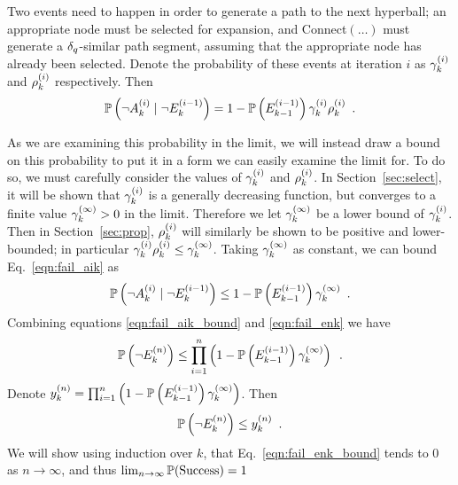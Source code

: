 Two events need to happen in order to generate a path to the next hyperball; an appropriate node must be selected for expansion, and Connect$(\dots)$ must generate a $\delta_q$-similar path segment, assuming that the appropriate node has already been selected. Denote the probability of these events at iteration $i$ as $\gamma_k^{(i)}$ and $\rho_k^{(i)}$ respectively. Then
\begin{equation}
    \mathbb{P}\left( \neg A^{(i)}_k \mid \neg E^{(i-1)}_k \right) = 1 - \mathbb{P}\left( E^{(i-1)}_{k-1} \right) \gamma_k^{(i)} \rho_k^{(i)} \enspace .
    \label{eqn:fail_aik}
\end{equation}

\noindent
As we are examining this probability in the limit, we will instead draw a bound on this probability to put it in a form we can easily examine the limit for. To do so, we must carefully consider the values of $\gamma_k^{(i)}$ and $\rho_k^{(i)}$.  In Section~\ref{sec:select}, it will be shown that $\gamma_k^{(i)}$ is a generally decreasing function, but converges to a finite value $\gamma_k^{(\infty)} > 0$ in the limit.  Therefore we let $\gamma_k^{(\infty)}$ be a lower bound of $\gamma_k^{(i)}$.  Then in Section~\ref{sec:prop}, $\rho_k^{(i)}$ will similarly be shown to be positive and lower-bounded; in particular $\gamma_k^{(i)} \rho_k^{(i)} \leq \gamma_k^{(\infty)}$.  Taking $\gamma_k^{(\infty)}$ as constant, we can bound Eq.~\eqref{eqn:fail_aik} as
\begin{equation}
    \mathbb{P}\left( \neg A^{(i)}_k \mid \neg E^{(i-1)}_k \right) \leq 1 - \mathbb{P}\left( E^{(i-1)}_{k-1} \right) \gamma_k^{(\infty)} \enspace .
    \label{eqn:fail_aik_bound}
\end{equation}
Combining equations \eqref{eqn:fail_aik_bound} and \eqref{eqn:fail_enk} we have
\begin{equation}
    \mathbb{P}\left( \neg E^{(n)}_k \right) \leq \prod_{i=1}^n \left(1 - \mathbb{P}\left( E^{(i-1)}_{k-1} \right) \gamma_k^{(\infty)} \right) \enspace .
\end{equation}
Denote $y^{(n)}_k = \prod_{i=1}^n \left(1 - \mathbb{P}\left( E^{(i-1)}_{k-1} \right) \gamma_k^{(\infty)} \right)$. Then
\begin{equation}
    \mathbb{P}\left( \neg E^{(n)}_k \right) \leq y^{(n)}_k \enspace .
    \label{eqn:fail_enk_bound}
\end{equation}
We will show using induction over $k$, that Eq.~\eqref{eqn:fail_enk_bound} tends to 0 as $n \rightarrow \infty$, and thus $\lim_{n \rightarrow \infty} \mathbb{P}(\textrm{Success}) = 1$\\

